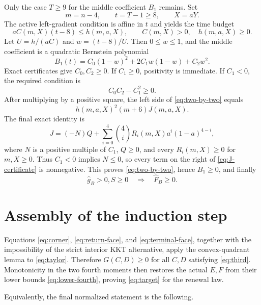 \documentclass[11pt]{article}
\begin{document}
Only the case $T\ge9$ for the middle coefficient $B_1$ remains.  Set
\[
 m=n-4,\qquad t=T-1\ge8,\qquad X=aY.
\]
The active left-gradient condition is affine in $t$ and yields the time
budget
\begin{equation}\label{eq:time-budget}
 aC(m,X)(t-8)\le h(m,a,X),
 \qquad C(m,X)>0,\quad h(m,a,X)\ge0.
\end{equation}
Let $U=h/(aC)$ and $w=(t-8)/U$.  Then $0\le w\le1$, and the middle
coefficient is a quadratic Bernstein polynomial
\begin{equation}\label{eq:time-bern}
 B_1(t)=C_0(1-w)^2+2C_1w(1-w)+C_2w^2.
\end{equation}
Exact certificates give $C_0,C_2\ge0$.  If $C_1\ge0$, positivity is
immediate.  If $C_1<0$, the required condition is
\begin{equation}\label{eq:two-by-two}
 C_0C_2-C_1^2\ge0.
\end{equation}
After multiplying by a positive square, the left side of
\eqref{eq:two-by-two} equals
\[
 h(m,a,X)^2(m+6)J(m,a,X).
\]
The final exact identity is
\begin{equation}\label{eq:J-certificate}
 J=(-N)Q+\sum_{i=0}^{4}\binom4i R_i(m,X)a^i(1-a)^{4-i},
\end{equation}
where $N$ is a positive multiple of $C_1$, $Q\ge0$, and every
$R_i(m,X)\ge0$ for $m,X\ge0$.  Thus $C_1<0$ implies $N\le0$, so every term
on the right of \eqref{eq:J-certificate} is nonnegative.  This proves
\eqref{eq:two-by-two}, hence $B_1\ge0$, and finally
\begin{equation}\label{eq:terminal-face}
 \widehat g_B>0, S\ge0\quad\Longrightarrow\quad \widehat F_B\ge0.
\end{equation}

\section{Assembly of the induction step}

Equations \eqref{eq:corner}, \eqref{eq:return-face}, and
\eqref{eq:terminal-face}, together with the impossibility of the strict
interior KKT alternative, apply the convex-quadrant lemma to
\eqref{eq:taylor}.  Therefore $G(C,D)\ge0$ for all $C,D$ satisfying
\eqref{eq:third}.  Monotonicity in the two fourth moments then restores the
actual $E,F$ from their lower bounds \eqref{eq:lower-fourth}, proving
\eqref{eq:target} for the renewal law.

Equivalently, the final normalized statement is the following.
\end{document}
